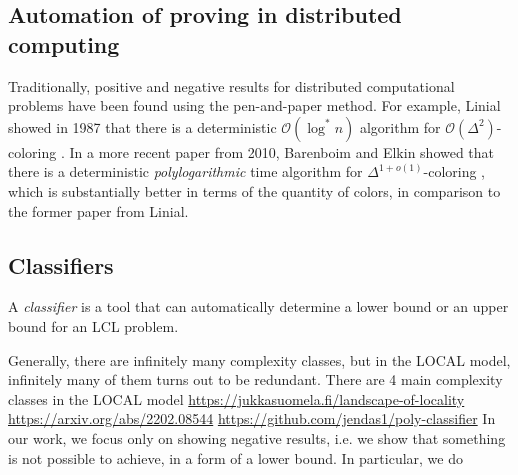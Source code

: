 


%
%
%
\subsection{Automation of proving in distributed computing} \label{sec:prior_work:title_b}
Traditionally, positive and negative results for distributed computational problems have been found using the pen-and-paper method.
For example, Linial showed in 1987 that there is a deterministic \(\mathcal{O}(\log^* n)\) algorithm for \(\mathcal{O}(\Delta^2)\)-coloring \cite{DBLP:conf/focs/Linial87}.
In a more recent paper from 2010, Barenboim and Elkin showed that there is a deterministic \emph{polylogarithmic} time algorithm for \(\Delta^{1 + o(1)}\)-coloring \cite{DBLP:conf/podc/BarenboimE10}, which is substantially better in terms of the quantity of colors, in comparison to the former paper \cite{DBLP:conf/focs/Linial87} from Linial.
\subsection{Classifiers} \label{sec:prior_work:title_c}


A \emph{classifier} is a tool that can automatically determine a lower bound or an upper bound for an LCL problem.


Generally, there are infinitely many complexity classes, but in the LOCAL model, infinitely many of them turns out to be redundant.
There are 4 main complexity classes in the LOCAL model \url{https://jukkasuomela.fi/landscape-of-locality}
\url{https://arxiv.org/abs/2202.08544}
\url{https://github.com/jendas1/poly-classifier}
In our work, we focus only on showing negative results, i.e. we show that something is not possible to achieve, in a form of a lower bound.
In particular, we do

